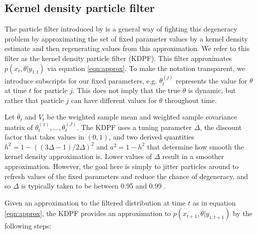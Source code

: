 \documentclass{elsarticle}
\begin{document}
\subsection{Kernel density particle filter \label{sec:kd}}

The particle filter introduced by \citet{Liu:West:comb:2001} is a general way of fighting this degeneracy problem by approximating the set of fixed parameter values by a kernel density estimate and then regenerating values from this approximation. We refer to this filter as the kernel density particle filter (KDPF). This filter approximates $p(x_t,\theta| y_{1:t})$ via equation \eqref{eqn:approx}. To make the notation transparent, we introduce subscripts for our fixed parameters, e.g. $\theta_t^{(j)}$ represents the value for $\theta$ at time $t$ for particle $j$. This does not imply that the true $\theta$ is dynamic, but rather that particle $j$ can have different values for $\theta$ throughout time.

Let $\bar{\theta}_t$ and $V_t$ be the weighted sample mean and weighted sample covariance matrix of $\theta_t^{(1)},\ldots,\theta_t^{(J)}$.  The KDPF uses a tuning parameter $\Delta$, the discount factor that takes values in $(0,1)$, and two derived quantities $h^2 = 1 - ((3\Delta - 1)/2\Delta)^2$ and $a^2 = 1 - h^2$ that determine how smooth the kernel density approximation is. Lower values of $\Delta$ result in a smoother approximation. However, the goal here is simply to jitter particles around to refresh values of the fixed parameters and reduce the chance of degeneracy, and so $\Delta$ is typically taken to be between 0.95 and 0.99 \citep{Liu:West:comb:2001}.

Given an approximation to the filtered distribution at time $t$ as in equation \eqref{eqn:approx}, the KDPF provides an approximation to $p(x_{t+1},\theta|y_{1:t+1})$ by the following steps:
\end{document}

